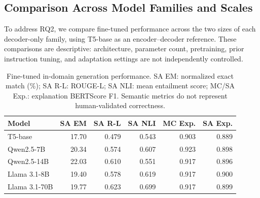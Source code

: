 \documentclass[a4paper,fleqn]{cas-sc}
\begin{document}


\subsection{Comparison Across Model Families and Scales}
\label{sec:model_family_scale}

To address RQ2, we compare fine-tuned performance across the two sizes of each decoder-only family, using T5-base as an encoder--decoder reference. These comparisons are descriptive: architecture, parameter count, pretraining, prior instruction tuning, and adaptation settings are not independently controlled.

\begin{table}[htbp]
\centering
\small
\setlength{\tabcolsep}{5pt}
\caption{Fine-tuned in-domain generation performance. SA EM: normalized exact match (\%); SA R-L: ROUGE-L; SA NLI: mean entailment score; MC/SA Exp.: explanation BERTScore F1. Semantic metrics do not represent human-validated correctness.}
\label{tab:model_family_generation}
\begin{tabular}{lrrrrr}
\toprule
Model & SA EM & SA R-L & SA NLI & MC Exp. & SA Exp. \\
\midrule
T5-base & 17.70 & 0.479 & 0.543 & 0.903 & 0.889 \\
Qwen2.5-7B & 20.34 & 0.574 & 0.607 & 0.923 & 0.898 \\
Qwen2.5-14B & 22.03 & 0.610 & 0.551 & 0.917 & 0.896 \\
Llama 3.1-8B & 19.40 & 0.578 & 0.619 & 0.917 & 0.900 \\
Llama 3.1-70B & 19.77 & 0.623 & 0.699 & 0.917 & 0.899 \\
\bottomrule
\end{tabular}
\end{table}
\end{document}
